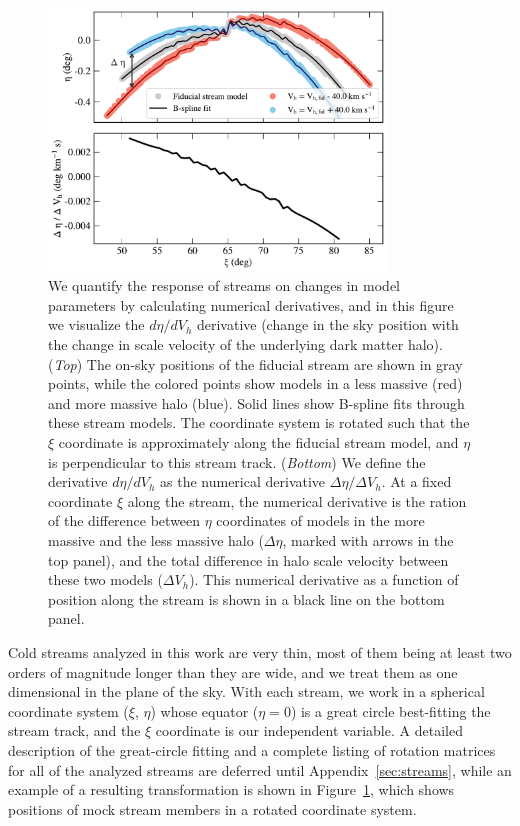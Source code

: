 \documentclass[modern]{aastex61}
\begin{document}
\begin{figure}
\begin{center}
\includegraphics[width=0.8\textwidth]{derivative_vis.pdf}
\caption{We quantify the response of streams on changes in model parameters by calculating numerical derivatives, and in this figure we visualize the $d\eta / d V_h$ derivative (change in the sky position with the change in scale velocity of the underlying dark matter halo).
(\emph{Top}) The on-sky positions of the fiducial stream are shown in gray points, while the colored points show models in a less massive (red) and more massive halo (blue).
Solid lines show B-spline fits through these stream models.
The coordinate system is rotated such that the $\xi$ coordinate is approximately along the fiducial stream model, and $\eta$ is perpendicular to this stream track. 
(\emph{Bottom}) We define the derivative $d\eta / d V_h$ as the numerical derivative $\Delta\eta / \Delta V_h$.
At a fixed coordinate $\xi$ along the stream, the numerical derivative is the ration of the difference between $\eta$ coordinates of models in the more massive and the less massive halo ($\Delta\eta$, marked with arrows in the top panel), and the total difference in halo scale velocity between these two models ($\Delta V_h$).
This numerical derivative as a function of position along the stream is shown in a black line on the bottom panel.
}
\label{fig:derivative_steps}
\end{center}
\end{figure}

Cold streams analyzed in this work are very thin, most of them being at least two orders of magnitude longer than they are wide, and we treat them as one dimensional in the plane of the sky.
With each stream, we work in a spherical coordinate system ($\xi$, $\eta$) whose equator ($\eta=0$) is a great circle best-fitting the stream track, and the $\xi$ coordinate is our independent variable.
A detailed description of the great-circle fitting and a complete listing of rotation matrices for all of the analyzed streams are deferred until Appendix~\ref{sec:streams}, while an example of a resulting transformation is shown in Figure~\ref{fig:derivative_steps}, which shows positions of mock stream members in a rotated coordinate system.
\end{document}
